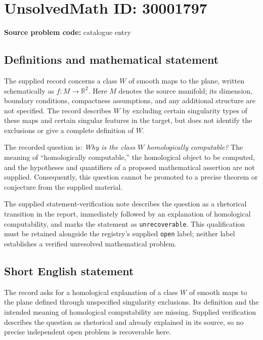 \documentclass[11pt]{article}
\newcommand{\R}{\mathbb{R}}
\begin{document}
\section*{UnsolvedMath ID: 30001797}
\textbf{Source problem code:} catalogue entry
\subsection{Definitions and mathematical statement}
The supplied record concerns a class \(W\) of smooth maps to the plane, written schematically as \(f\colon M\to\R^2\). Here \(M\) denotes the source manifold; its dimension, boundary conditions, compactness assumptions, and any additional structure are not specified. The record describes \(W\) by excluding certain singularity types of these maps and certain singular features in the target, but does not identify the exclusions or give a complete definition of \(W\).

The recorded question is: \emph{Why is the class \(W\) homologically computable?} The meaning of ``homologically computable,'' the homological object to be computed, and the hypotheses and quantifiers of a proposed mathematical assertion are not supplied. Consequently, this question cannot be promoted to a precise theorem or conjecture from the supplied material.

The supplied statement-verification note describes the question as a rhetorical transition in the report, immediately followed by an explanation of homological computability, and marks the statement as \texttt{unrecoverable}. This qualification must be retained alongside the registry's supplied \texttt{open} label; neither label establishes a verified unresolved mathematical problem.
\subsection{Short English statement}
The record asks for a homological explanation of a class \(W\) of smooth maps to the plane defined through unspecified singularity exclusions. Its definition and the intended meaning of homological computability are missing. Supplied verification describes the question as rhetorical and already explained in its source, so no precise independent open problem is recoverable here.
\end{document}
